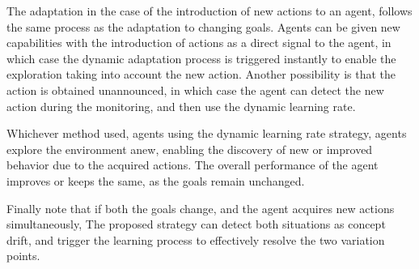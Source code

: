 The adaptation in the case of the introduction of new actions to an agent, follows the same process 
as the adaptation to changing goals. Agents can be given new capabilities with the introduction of 
actions as a direct signal to the agent, in which case the dynamic adaptation process is triggered 
instantly to enable the exploration taking into account the new action. Another possibility is that the 
action is obtained unannounced, in which case the agent can detect the new action during the 
monitoring, and then use the dynamic learning rate.

Whichever method used, agents using the dynamic learning rate strategy, agents explore the 
environment anew, enabling the discovery of new or improved behavior due to the acquired actions. 
The overall performance of the agent improves or keeps the same, as the goals remain unchanged.

Finally note that if both the goals change, and the agent acquires new actions simultaneously, 
The proposed strategy can detect both situations as concept drift, and trigger the learning process 
to effectively resolve the two variation points.


\endinput

